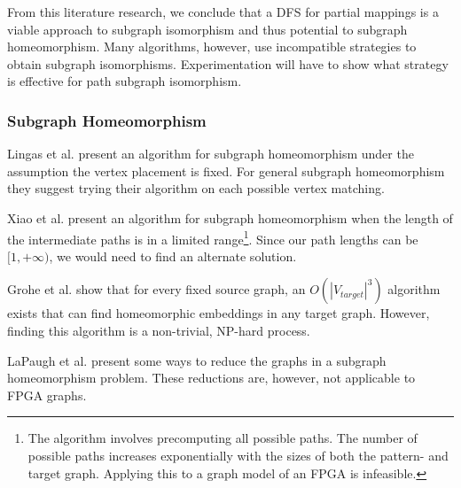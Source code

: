 From this literature research, we conclude that a DFS for partial mappings is a viable approach to subgraph isomorphism and thus potential to subgraph homeomorphism. Many algorithms, however, use incompatible strategies to obtain subgraph isomorphisms. Experimentation will have to show what strategy is effective for path subgraph isomorphism.


\subsubsection{Subgraph Homeomorphism}
Lingas et al.\cite{LINGAS2009464} present an algorithm for subgraph homeomorphism under the assumption the vertex placement is fixed. For general subgraph homeomorphism they suggest trying their algorithm on each possible vertex matching.

Xiao et al.\cite{XIAONODEDISJOINT} present an algorithm for subgraph homeomorphism when the length of the intermediate paths is in a limited range\footnote{The algorithm involves precomputing all possible paths. The number of possible paths increases exponentially with the sizes of both the pattern- and target graph. Applying this to a graph model of an FPGA is infeasible.}. Since our path lengths can be $[1, +\infty)$, we would need to find an alternate solution.

Grohe et al.\cite{Grohe2011479} show that for every fixed source graph, an $O(|V_{target}|^3)$ algorithm exists that can find homeomorphic embeddings in any target graph. However, finding this algorithm is a non-trivial, NP-hard process.

LaPaugh et al.\cite{LaPaughOptim} present some ways to reduce the graphs in a subgraph homeomorphism problem. These reductions are, however, not applicable to FPGA graphs.


